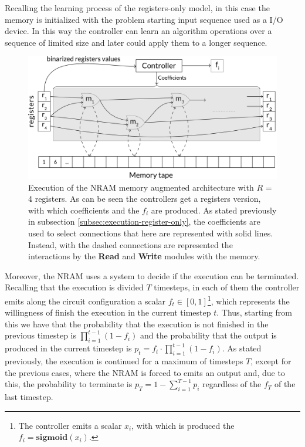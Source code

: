 Recalling the learning process of the registers-only model, in this case the memory is initialized with the problem starting input sequence used as a I/O device. In this way the controller can learn an algorithm operations over a sequence of limited size and later could apply them to a longer sequence.\newline
\begin{figure}[t!]
	\centering
	\includegraphics[width=\textwidth]{figures/memory-augmented-model.png}
	\caption{Execution of the NRAM memory augmented architecture with $R$ = 4 registers. As can be seen the controllers get a registers  version, with which coefficients and the $f_{i}$ are produced. As stated previously in subsection \ref{subsec:execution-register-only}, the coefficients are used to select connections that here are represented with solid lines. Instead, with the dashed connections are represented the interactions by the \textbf{Read} and \textbf{Write} modules with the memory.}
	\label{fig:perceptron-boundaries}
\end{figure}
Moreover, the NRAM uses a system to decide if the execution can be terminated. Recalling that the execution is divided $T$ timesteps, in each of them the controller emits along the circuit configuration a scalar $f_{t} \in [0, 1]$\footnote{The controller emits a scalar $x_{i}$, with which is produced the $f_i = \textbf{sigmoid}(x_{i})$.}, which represents the willingness of finish the execution in the current timestep $t$. Thus, starting from this we have that the probability that the execution is not finished in the previous timestep is $\prod\limits_{i=1}^{t-1}(1 - f_{i})$ and the probability that the output is produced in the current timestep is $p_{t} = f_{t} \cdot \prod\limits_{i=1}^{t-1}(1 - f_{i})$. As stated previously, the execution is continued for a maximum of timesteps $T$, except for the previous cases, where the NRAM is forced to emits an output and, due to this, the probability to terminate is $p_{T} = 1 - \sum\limits_{i=1}^{T-1}p_{i}$ regardless of the $f_{T}$ of the last timestep.

